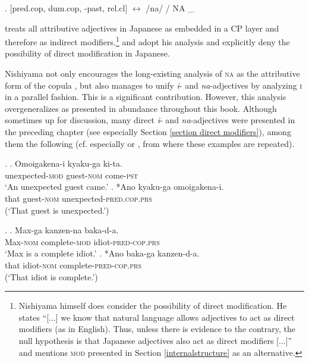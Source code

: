 \ex. [pred.cop, dum.cop, -past, rel.cl] $\leftrightarrow$ /na/ / NA \_ \\ \null \hfill \citep[197]{nishiyama:1999:adj}

\citet{nishiyama:1999:adj} treats all attributive adjectives in Japanese as embedded in a CP layer and therefore as indirect modifiers.\footnote{Nishiyama himself does consider the possibility of direct modification. He states ``[...] we know that natural language allows adjectives to act as direct modifiers (as in English). Thus, unless there is evidence to the contrary, the null hypothesis is that Japanese adjectives also act as direct modifiers [...]” \citep[201]{nishiyama:1999:adj} and mentions \textsc{mod} presented in Section \ref{internalstructure} as an alternative.} \citet{baker:2003:verbal} and \citet{hoshi:2002:kaynean} adopt his analysis and explicitly deny the possibility of direct modification in Japanese.

Nishiyama not only encourages the long-existing analysis of \textsc{na} as the attributive form of the copula \citep{teramura:1982:nihongo, miyagawa:1987:lexical, murasugi:1991:noun, kubo:1992:japanese, urushibara:1993:syntactic}, but also manages to unify \textit{i}- and \textit{na}-adjectives by analyzing \textsc{i} in a parallel fashion. This is a significant contribution. However, this analysis overgeneralizes as presented in abundance throughout this book. Although sometimes up for discussion, many direct \textit{i}- and \textit{na}-adjectives were presented in the preceding chapter (see especially Section \ref{section direct modifiers}), among them the following (cf. especially \citealt{yamakido:2005:nature} or \citealt{ayano:2010:revisiting}, from where these examples are repeated). %

\ex. \ag. Omoigakena-i kyaku-ga ki-ta.\\
unexpected-\textsc{mod} guest-\textsc{nom} come-\textsc{pst}\\
`An unexpected guest came.' \null \hfill \citep[67]{yamakido:2005:nature}
\bg. *Ano kyaku-ga omoigakena-i.\\
that guest-\textsc{nom} unexpected-\textsc{pred.cop.prs}\\
(`That guest is unexpected.’)

\ex. \ag. Max-ga kanzen-na baka-d-a.\\
Max-\textsc{nom} complete-\textsc{mod} idiot-\textsc{pred-cop.prs}\\
`Max is a complete idiot.' \null \hfill \citep[68]{yamakido:2005:nature}
\bg. *Ano baka-ga kanzen-d-a.\\
that idiot-\textsc{nom} complete-\textsc{pred-cop.prs}\\
(`That idiot is complete.’)

